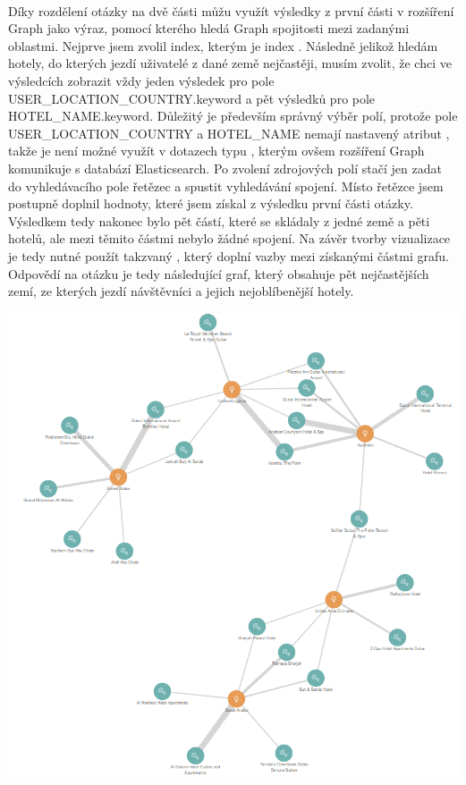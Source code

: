 \documentclass[czech,BP]{thesiskiv}
\begin{document}
\mbox{}\\
Díky rozdělení otázky na dvě části můžu využít výsledky z první části v rozšíření Graph jako výraz, pomocí kterého hledá Graph spojitosti mezi zadanými oblastmi. Nejprve jsem zvolil index, kterým je index . Následně jelikož hledám hotely, do kterých jezdí uživatelé z dané země nejčastěji, musím zvolit, že chci ve výsledcích zobrazit vždy jeden výsledek pro pole USER\_LOCATION\_COUNTRY.keyword a pět výsledků pro pole HOTEL\_NAME.keyword. Důležitý je především správný výběr polí, protože pole USER\_LOCATION\_COUNTRY a HOTEL\_NAME nemají nastavený atribut , takže je není možné využít v dotazech typu , kterým ovšem rozšíření Graph komunikuje s databází Elasticsearch. Po zvolení zdrojových polí stačí jen zadat do vyhledávacího pole řetězec  a spustit vyhledávání spojení. Místo řetězce  jsem postupně doplnil hodnoty, které jsem získal z výsledku první části otázky. Výsledkem tedy nakonec bylo pět částí, které se skládaly z jedné země a pěti hotelů, ale mezi těmito částmi nebylo žádné spojení. Na závěr tvorby vizualizace je tedy nutné použít takzvaný , který doplní vazby mezi získanými částmi grafu. Odpovědí na otázku je tedy následující graf, který obsahuje pět nejčastějších zemí, ze kterých jezdí návštěvníci a jejich nejoblíbenější hotely.
\begin{center}
	\includegraphics[width = \textwidth]{img/5_countries_highest_appearance_graph.png}
\end{center}
\end{document}
